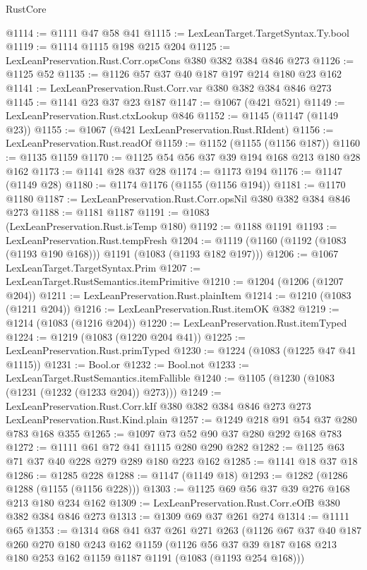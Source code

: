 \begin{lexlean}{RustCore}
\begin{coremodule}
{\begin{coremodule}
{{{{{@1114 := @1111 @47 @58 @41
@1115 := LexLeanTarget.TargetSyntax.Ty.bool
@1119 := @1114 @1115 @198 @215 @204
@1125 := LexLeanPreservation.Rust.Corr.opsCons @380 @382 @384 @846 @273
@1126 := @1125 @52
@1135 := @1126 @57 @37 @40 @187 @197 @214 @180 @23 @162
@1141 := LexLeanPreservation.Rust.Corr.var @380 @382 @384 @846 @273
@1145 := @1141 @23 @37 @23 @187
@1147 := @1067 (@421 @521)
@1149 := LexLeanPreservation.Rust.ctxLookup @846
@1152 := @1145 (@1147 (@1149 @23))
@1155 := @1067 (@421 LexLeanPreservation.Rust.RIdent)
@1156 := LexLeanPreservation.Rust.readOf
@1159 := @1152 (@1155 (@1156 @187))
@1160 := @1135 @1159
@1170 := @1125 @54 @56 @37 @39 @194 @168 @213 @180 @28 @162
@1173 := @1141 @28 @37 @28
@1174 := @1173 @194
@1176 := @1147 (@1149 @28)
@1180 := @1174 @1176 (@1155 (@1156 @194))
@1181 := @1170 @1180
@1187 := LexLeanPreservation.Rust.Corr.opsNil @380 @382 @384 @846 @273
@1188 := @1181 @1187
@1191 := @1083 (LexLeanPreservation.Rust.isTemp @180)
@1192 := @1188 @1191
@1193 := LexLeanPreservation.Rust.tempFresh
@1204 := @1119 (@1160 (@1192 (@1083 (@1193 @190 @168))) @1191 (@1083 (@1193 @182 @197)))
@1206 := @1067 LexLeanTarget.TargetSyntax.Prim
@1207 := LexLeanTarget.RustSemantics.itemPrimitive
@1210 := @1204 (@1206 (@1207 @204))
@1211 := LexLeanPreservation.Rust.plainItem
@1214 := @1210 (@1083 (@1211 @204))
@1216 := LexLeanPreservation.Rust.itemOK @382
@1219 := @1214 (@1083 (@1216 @204))
@1220 := LexLeanPreservation.Rust.itemTyped
@1224 := @1219 (@1083 (@1220 @204 @41))
@1225 := LexLeanPreservation.Rust.primTyped
@1230 := @1224 (@1083 (@1225 @47 @41 @1115))
@1231 := Bool.or
@1232 := Bool.not
@1233 := LexLeanTarget.RustSemantics.itemFallible
@1240 := @1105 (@1230 (@1083 (@1231 (@1232 (@1233 @204)) @273)))
@1249 := LexLeanPreservation.Rust.Corr.kIf
    @380
    @382
    @384
    @846
    @273
    @273
    LexLeanPreservation.Rust.Kind.plain
@1257 := @1249 @218 @91 @54 @37 @280 @783 @168 @355
@1265 := @1097 @73 @52 @90 @37 @280 @292 @168 @783
@1272 := @1111 @61 @72 @41 @1115 @280 @290 @282
@1282 := @1125 @63 @71 @37 @40 @228 @279 @289 @180 @223 @162
@1285 := @1141 @18 @37 @18
@1286 := @1285 @228
@1288 := @1147 (@1149 @18)
@1293 := @1282 (@1286 @1288 (@1155 (@1156 @228)))
@1303 := @1125 @69 @56 @37 @39 @276 @168 @213 @180 @234 @162
@1309 := LexLeanPreservation.Rust.Corr.eOfB @380 @382 @384 @846 @273
@1313 := @1309 @69 @37 @261 @274
@1314 := @1111 @65
@1353 := @1314
    @68
    @41
    @37
    @261
    @271
    @263
    (@1126
      @67
      @37
      @40
      @187
      @260
      @270
      @180
      @243
      @162
      @1159
      (@1126 @56 @37 @39 @187 @168 @213 @180 @253 @162 @1159 @1187 @1191 (@1083 (@1193 @254 @168)))
}}}}}
\end{coremodule}}
\end{coremodule}
\end{lexlean}
